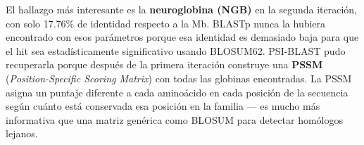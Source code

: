 El hallazgo más interesante es la \textbf{neuroglobina (NGB)} en la segunda iteración, con solo 17.76\%
de identidad respecto a la Mb. BLASTp nunca la hubiera encontrado con esos parámetros porque esa identidad
es demasiado baja para que el hit sea estadísticamente significativo usando BLOSUM62. PSI-BLAST pudo
recuperarla porque después de la primera iteración construye una \textbf{PSSM}
(\textit{Position-Specific Scoring Matrix}) con todas las globinas encontradas. La PSSM asigna un puntaje
diferente a cada aminoácido en cada posición de la secuencia según cuánto está conservada esa posición en
la familia --- es mucho más informativa que una matriz genérica como BLOSUM para detectar homólogos lejanos.
